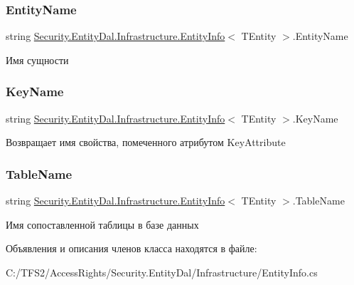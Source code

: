 \subsubsection{\texorpdfstring{Entity\+Name}{EntityName}}
{\footnotesize\ttfamily string \hyperlink{class_security_1_1_entity_dal_1_1_infrastructure_1_1_entity_info}{Security.\+Entity\+Dal.\+Infrastructure.\+Entity\+Info}$<$ T\+Entity $>$.Entity\+Name\hspace{0.3cm}{\ttfamily [get]}}



Имя сущности 

\mbox{\label{class_security_1_1_entity_dal_1_1_infrastructure_1_1_entity_info_a33cdc95217b297c5270b71baec8e71d3}} 
\subsubsection{\texorpdfstring{Key\+Name}{KeyName}}
{\footnotesize\ttfamily string \hyperlink{class_security_1_1_entity_dal_1_1_infrastructure_1_1_entity_info}{Security.\+Entity\+Dal.\+Infrastructure.\+Entity\+Info}$<$ T\+Entity $>$.Key\+Name\hspace{0.3cm}{\ttfamily [get]}}



Возвращает имя свойства, помеченного атрибутом Key\+Attribute 

\mbox{\label{class_security_1_1_entity_dal_1_1_infrastructure_1_1_entity_info_aa6fea198687d571bb309a59771aab2be}} 
\subsubsection{\texorpdfstring{Table\+Name}{TableName}}
{\footnotesize\ttfamily string \hyperlink{class_security_1_1_entity_dal_1_1_infrastructure_1_1_entity_info}{Security.\+Entity\+Dal.\+Infrastructure.\+Entity\+Info}$<$ T\+Entity $>$.Table\+Name\hspace{0.3cm}{\ttfamily [get]}}



Имя сопоставленной таблицы в базе данных 



Объявления и описания членов класса находятся в файле\+:\begin{DoxyCompactItemize}
\item 
C\+:/\+T\+F\+S2/\+Access\+Rights/\+Security.\+Entity\+Dal/\+Infrastructure/Entity\+Info.\+cs\end{DoxyCompactItemize}
